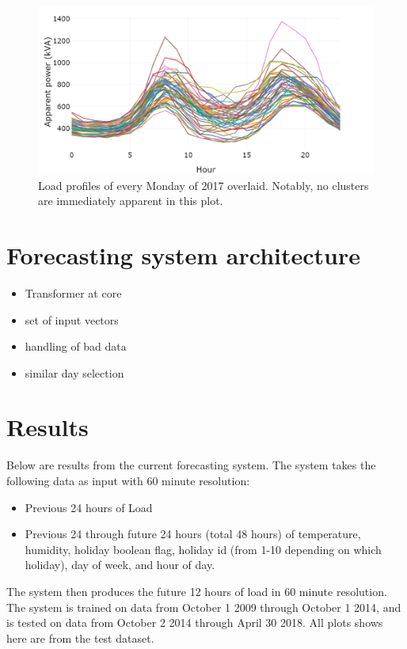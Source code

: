 \begin{figure}
	\centering
	\includegraphics[width=0.8\linewidth]{images/all-monday-profiles}
	\caption{Load profiles of every Monday of 2017 overlaid. Notably, no clusters are immediately apparent in this plot.}
	\label{fig:all-monday-profiles}
\end{figure}


\section{Forecasting system architecture}
\begin{itemize}
	\item Transformer at core
	\item set of input vectors
	\item handling of bad data
	\item similar day selection
\end{itemize}


\section{Results}
\label{bruny-results}
Below are results from the current forecasting system.
The system takes the following data as input with 60 minute resolution:
\begin{itemize}
	\item Previous 24 hours of Load
	\item Previous 24 through future 24 hours (total 48 hours) of temperature, humidity, holiday boolean flag, holiday id (from 1-10 depending on which holiday), day of week, and hour of day.
\end{itemize}

The system then produces the future 12 hours of load in 60 minute resolution.
The system is trained on data from October 1 2009 through October 1 2014, and is tested on data from October 2 2014 through April 30 2018.
All plots shows here are from the test dataset.


